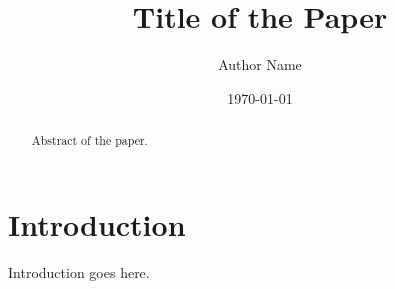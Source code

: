 \documentclass{elsarticle}
\begin{document}
\title{Title of the Paper}
\author{Author Name}
\date{\today}

\begin{abstract}
Abstract of the paper.
\end{abstract}

\section{Introduction}

Introduction goes here.
\end{document}
